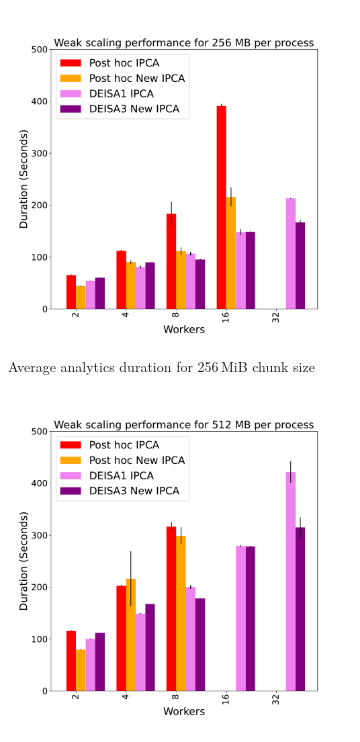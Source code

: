 \begin{figure}
\begin{subfigure}[b]{0.3\textwidth}
         \includegraphics[width=\textwidth, height=\textwidth]{figures/256A_1vs3vspost1vspost2.pdf}
         \caption{Average analytics duration for 256\,MiB chunk size}
         \label{fig:A256_1_3_p}
     \end{subfigure}
     \hfill
     \begin{subfigure}[b]{0.3\textwidth}
         \centering
         \includegraphics[width=\textwidth, height=\textwidth]{figures/512A_1vs3vspost1vspost2.pdf}

\end{subfigure}
\end{figure}
